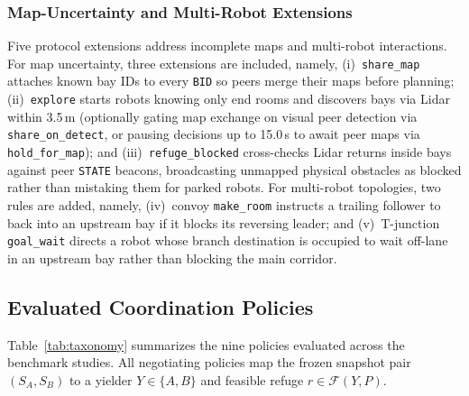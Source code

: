 \subsubsection{Map-Uncertainty and Multi-Robot Extensions} 
Five protocol extensions address incomplete maps and multi-robot interactions. For map uncertainty, three extensions are included, namely, 
(i)~\texttt{share\_map} attaches known bay IDs to every \texttt{BID} so peers merge their maps before planning; 
(ii)~\texttt{explore} starts robots knowing only end rooms and discovers bays via Lidar within 3.5\,m (optionally gating map exchange on visual peer detection via \texttt{share\_on\_detect}, or pausing decisions up to 15.0\,s to await peer maps via \texttt{hold\_for\_map}); and 
(iii)~\texttt{refuge\_blocked} cross-checks Lidar returns inside bays against peer \texttt{STATE} beacons, broadcasting unmapped physical obstacles as blocked rather than mistaking them for parked robots. 
For multi-robot topologies, two rules are added, namely, 
(iv)~convoy \texttt{make\_room} instructs a trailing follower to back into an upstream bay if it blocks its reversing leader; and 
(v)~T-junction \texttt{goal\_wait} directs a robot whose branch destination is occupied to wait off-lane in an upstream bay rather than blocking the main corridor.

\subsection{Evaluated Coordination Policies}\label{sec:pol}
Table~\ref{tab:taxonomy} summarizes the nine policies evaluated across the benchmark studies. All negotiating policies map the frozen snapshot pair $(S_A, S_B)$ to a yielder $Y \in \{A, B\}$ and feasible refuge $r \in \mathcal{F}(Y, P)$.


